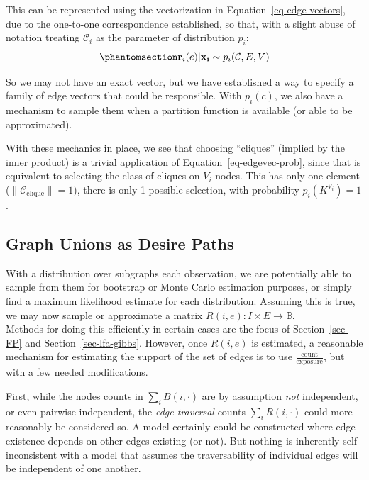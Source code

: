 \documentclass[%
	12pt,
		oneside,
		letterpaper
]{book}
\begin{document}
This can be represented using the vectorization in
Equation~\ref{eq-edge-vectors}, due to the one-to-one correspondence
established, so that, with a slight abuse of notation treating
\(\mathcal{C}_i\) as the parameter of distribution \(p_i\):
\begin{equation}\phantomsection\label{eq-edgevec-prob}{
\mathbf{r}_{i}(e)|\mathbf{x_i} \sim p_i(\mathcal{C},E,V)
}\end{equation}

So we may not have an exact vector, but we have established a way to
specify a family of edge vectors that could be responsible. With
\(p_i(c)\), we also have a mechanism to sample them when a partition
function is available (or able to be approximated).

With these mechanics in place, we see that choosing ``cliques'' (implied
by the inner product) is a trivial application of
Equation~\ref{eq-edgevec-prob}, since that is equivalent to selecting
the class of cliques on \(V_i\) nodes. This has only one element
(\(\|\mathcal{C}_{\text{clique}}\|=1\)), there is only 1 possible
selection, with probability \(p_i(K^{V_i})=1\).

\subsection{Graph Unions as Desire
Paths}\label{graph-unions-as-desire-paths}

With a distribution over subgraphs each observation, we are potentially
able to sample from them for bootstrap or Monte Carlo estimation
purposes, or simply find a maximum likelihood estimate for each
distribution. Assuming this is true, we may now sample or approximate a
matrix \(R(i,e):I\times E \rightarrow \mathbb{B}\).\\
Methods for doing this efficiently in certain cases are the focus of
Section~\ref{sec-FP} and Section~\ref{sec-lfa-gibbs}. However, once
\(R(i,e)\) is estimated, a reasonable mechanism for estimating the
support of the set of edges is to use
\(\frac{\text{count}}{\text{exposure}}\), but with a few needed
modifications.

First, while the nodes counts in \(\sum_i B(i,\cdot)\) are by assumption
\emph{not} independent, or even pairwise independent, the \emph{edge
traversal} counts \(\sum_i R(i,\cdot)\) could more reasonably be
considered so. A model certainly could be constructed where edge
existence depends on other edges existing (or not). But nothing is
inherently self-inconsistent with a model that assumes the
traversability of individual edges will be independent of one another.
\end{document}
